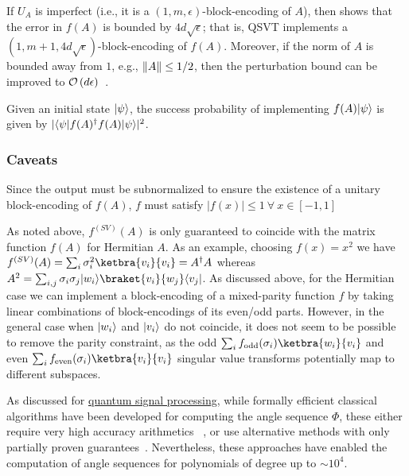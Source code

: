 \begin{refsection}
If $U_A$ is imperfect (i.e., it is a $(1, m, \epsilon)$-block-encoding of $A$), then \cite[Lemma 22]{gilyen2018QSingValTransf} shows that the error in $f(A)$ is bounded by $4d\sqrt{\epsilon}$; that is, QSVT implements a $(1, m+1, 4d\sqrt{\epsilon})$-block-encoding of $f(A)$. Moreover, if the norm of $A$ is bounded away from $1$, e.g., $\lVert A\rVert\leq 1/2$, then the perturbation bound can be improved to $\mathcal{O}\left( d\epsilon \right)$~\cite[Lemma 23]{gilyen2018QSingValTransf}. 

Given an initial state $\lvert\psi\rangle$, the success probability of implementing $f(A) \lvert\psi\rangle$ is given by $|\langle\psi\rvert f(A)^\dag f(A) \lvert\psi\rangle|^2$. 





\subsubsection*{Caveats}
Since the output must be subnormalized to ensure the existence of a unitary block-encoding of $f(A)$, $f$ must satisfy $|f(x)| \leq 1~\forall~x \in [-1,1]$ 

As noted above, $f^{(SV)}(A)$ is only guaranteed to coincide with the matrix function $f(A)$ for Hermitian $A$. As an example, choosing $f(x) = x^2$ we have $f^{(SV)}(A) = \sum_i \sigma_i^2 \ketbra{v_i}	{v_i}=A^\dagger A$ whereas $A^2 = \sum_{i,j} \sigma_i \sigma_j \ket{w_i}\braket{v_i}{ w_j}\bra{v_j}$. As discussed above, for the Hermitian case we can implement a block-encoding of a mixed-parity function $f$ by taking linear combinations of block-encodings of its even/odd parts. However, in the general case when $\lvert w_i\rangle$ and $\lvert v_i\rangle$ do not coincide, it does not seem to be possible to remove the parity constraint, as the odd $\sum_i f_{\mathrm{odd}}(\sigma_i) \ketbra{w_i}{v_i}$ and even $\sum_i f_{\mathrm{even}}(\sigma_i) \ketbra{v_i}{v_i}$ singular value transforms potentially map to different subspaces.
 
As discussed for \hyperref[prim:QSP]{quantum signal processing}, while formally efficient classical algorithms have been developed for computing the angle sequence $\Phi$, these either require very high accuracy arithmetics ~\cite{gilyen2018QSingValTransf,haah2018ProdDecPerFuncQSignPRoc}, or use alternative methods with only partially proven guarantees~\cite{dong2020efficientPhaseFindingInQSP,chao2020FindingAngleSequences}. Nevertheless, these approaches have enabled the computation of angle sequences for polynomials of degree up to $\sim10^4$.


\end{refsection}
